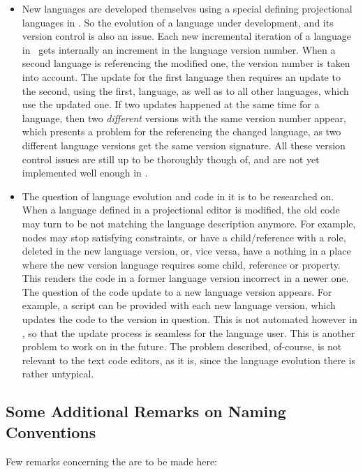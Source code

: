 \begin{itemize}
  \item  New languages are developed themselves using a special defining projectional languages in \jbmps. So the evolution of a language under development,
  and its version control is also an issue. Each new incremental iteration of a language in \jbmps\ gets internally an increment in the language
  version number. When a second language is referencing the modified one, the version number is taken into account. The update for the first language
  then requires an update to the second, using the first,  language, as well as to all other languages, which use the updated one. If two updates happened
  at the same time for a language, then two \emph{different} versions with the same version number appear, which presents a problem for the 
  referencing the changed language, as two different language versions get the same version signature. All these version control issues are still up to be 
  thoroughly though of, and are not yet 
  implemented well enough in \jbmps.

  \item  The question of language evolution and code in it is to be researched on.  When a language defined in a projectional editor is
  modified, the old code may turn to be not matching the language description anymore. For example, nodes may stop satisfying constraints,
  or have a child/reference with a role, deleted in the new language version, or, vice versa, have a nothing in a place where the new
  version language requires some child, reference or property. This renders the code in a former language version incorrect in a newer one.
  The question of the code update to a new language version appears. For example, a script can be provided with each new language version,
  which updates the code to the version in question. This is not automated however in \jbmps, so that the update process is seamless for the 
  language user. This is another problem to work on in the future. The problem described, of-course, is not relevant to the text code editors,
  as it is, since the language evolution there is rather untypical.
  
  
 \end{itemize}
  
  
  \subsection{Some Additional Remarks on Naming Conventions}
  \label{remarksonnamingconventions}
  Few remarks concerning the   are to be made here:
  
